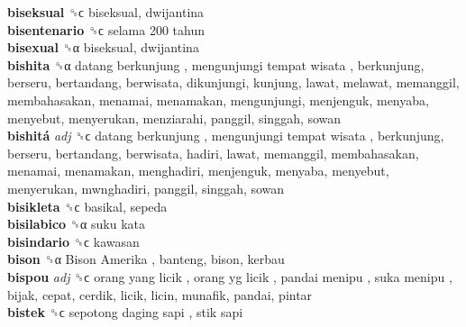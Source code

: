 \textbf{biseksual} ␝ϲ  biseksual, dwijantina  \\
\textbf{bisentenario} ␝ϲ   selama 200 tahun   \\
\textbf{bisexual} ␝α  biseksual, dwijantina  \\
\textbf{bishita} ␝α   datang berkunjung ,  mengunjungi tempat wisata , berkunjung, berseru, bertandang, berwisata, dikunjungi, kunjung, lawat, melawat, memanggil, membahasakan, menamai, menamakan, mengunjungi, menjenguk, menyaba, menyebut, menyerukan, menziarahi, panggil, singgah, sowan  \\
\textbf{bishitá} \emph{adj}  ␝ϲ   datang berkunjung ,  mengunjungi tempat wisata , berkunjung, berseru, bertandang, berwisata, hadiri, lawat, memanggil, membahasakan, menamai, menamakan, menghadiri, menjenguk, menyaba, menyebut, menyerukan, mwnghadiri, panggil, singgah, sowan  \\
\textbf{bisikleta} ␝ϲ  basikal, sepeda  \\
\textbf{bisilabico} ␝α   suku kata   \\
\textbf{bisindario} ␝ϲ  kawasan  \\
\textbf{bison} ␝α   Bison Amerika , banteng, bison, kerbau  \\
\textbf{bispou} \emph{adj}  ␝ϲ   orang yang licik ,  orang yg licik ,  pandai menipu ,  suka menipu , bijak, cepat, cerdik, licik, licin, munafik, pandai, pintar  \\
\textbf{bistek} ␝ϲ   sepotong daging sapi ,  stik sapi   \\
